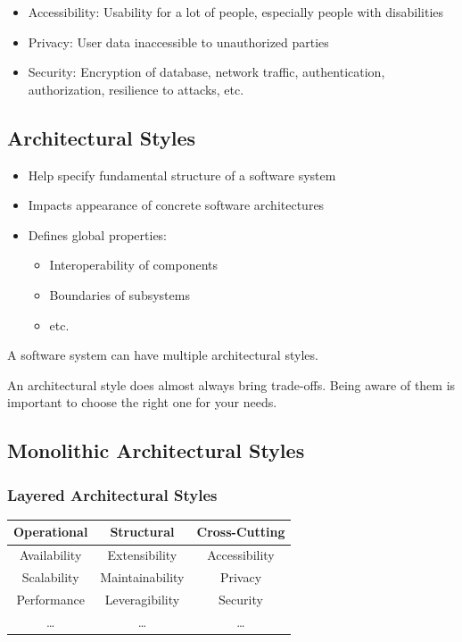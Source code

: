 \documentclass[
../../Software_Engineering_Summary.tex,
]
{subfiles}
\begin{document}
\begin{defbox}
    \begin{itemize}
        \item Accessibility: Usability for a lot of people, especially people with disabilities
        \item Privacy: User data inaccessible to unauthorized parties
        \item Security: Encryption of database, network traffic, authentication, authorization, resilience to attacks, etc.
    \end{itemize}
\end{defbox}

\newpage
\subsection{Architectural Styles}
\begin{itemize}
    \item Help specify fundamental structure of a software system
    \item Impacts appearance of concrete software architectures
    \item Defines global properties:
    \begin{itemize}
        \item Interoperability of components
        \item Boundaries of subsystems
        \item etc.
    \end{itemize}
\end{itemize}
A software system can have multiple architectural styles.

An architectural style does almost always bring trade-offs. Being aware of them is important to choose the right one for your needs.

\subsection{Monolithic Architectural Styles}
\subsubsection{Layered Architectural Styles}
    \begin{center}
        \begin{tabular}{|c|c|c|}
            \hline
            \rowcolor{codered!40}\textbf{Operational} & \textbf{Structural} & \textbf{Cross-Cutting}\\
            \hline
            Availability & Extensibility & Accessibility\\
            Scalability & Maintainability & Privacy\\
            Performance & Leveragibility & Security\\
            \dots & \dots & \dots\\
            \hline
        \end{tabular}
    \end{center}
\end{document}
